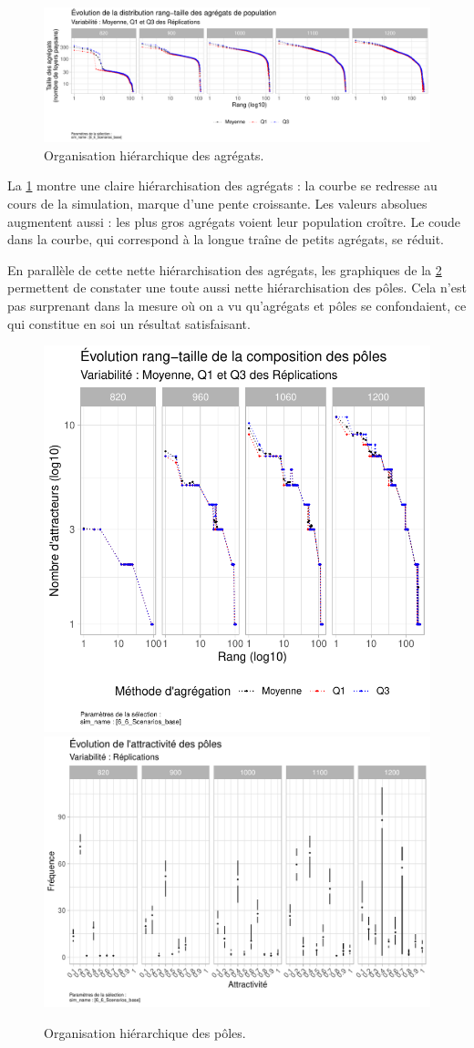 \begin{figure}[H]
	\centering
	\includegraphics[width=\linewidth]{img/results_6_6/Agregats_RT_Haut.pdf}
	\caption[Hiérarchie des agrégats]{Organisation hiérarchique des agrégats.}
	\label{fig:results-rt-agregats}
\end{figure}

La \cref{fig:results-rt-agregats} montre une claire hiérarchisation des agrégats : la courbe se \og redresse\fg{} au cours de la simulation, marque d'une pente croissante.
Les valeurs absolues augmentent aussi : les plus gros agrégats voient leur population croître.
Le \og coude\fg{} dans la courbe, qui correspond à la longue traîne de petits agrégats, se réduit.

En parallèle de cette nette hiérarchisation des agrégats, les graphiques de la  \cref{fig:results-rt-poles} permettent de constater une toute aussi nette hiérarchisation des pôles.
Cela n'est pas surprenant dans la mesure où on a vu qu'agrégats et pôles se confondaient, ce qui constitue en soi un résultat satisfaisant.


\begin{figure}[H]
	\centering
	\includegraphics[width=.405\linewidth]{img/results_6_6/Poles_RT_Haut.pdf}
	\includegraphics[width=.58\linewidth]{img/results_6_6/Poles_Attrac_Haut.pdf}
	\caption[Hiérarchie des pôles.]{Organisation hiérarchique des pôles.}
	\label{fig:results-rt-poles}
\end{figure}

